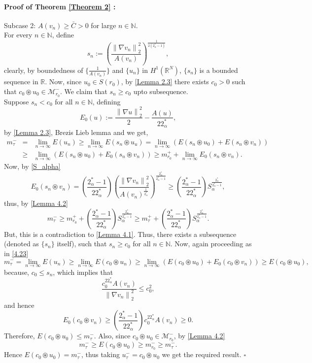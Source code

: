 \documentclass[11pt]{article}
\numberwithin{equation}{section}
\numberwithin{mytheorem}{section}
\newenvironment{myproof}[2] {\paragraph{Proof of {#1} {#2} :}}{\hfill$\square$}
\begin{document}
\begin{myproof}{Theorem}{\ref{Theorem 2}}
					Subcase 2: $A(v_n)\geq \bar{C}>0$ for large $n\in \mathbb{N}$.\\
					For every $n\in \mathbb{N}$, define $$s_n:=\left(\frac{\left\| \nabla v_n\right\|_2^2}{A(v_n)}\right)^{\frac{1}{2(2^*_{\alpha}-1)}},$$
					clearly, by boundedness of $\{\frac{1}{A(v_n)}\}$ and $\{u_n\}$ in $H^1(\mathbb{R}^N)$, $\{s_n\}$ is a bounded sequence in $\mathbb{R}$. Now, since $u_0\in S(r_0)$, by \autoref{Lemma 2.3} there exists $c_0>0$ such that $c_0\circledast u_0\in \mathcal{M}_{r_0}^-$. We claim that $s_n\geq c_0$ upto subsequence.\\
					Suppose $s_n<c_0$ for all $n\in \mathbb{N}$, defining 
					$$E_0(u):=\frac{\left\| \nabla u \right\|_2^2}{2}-\frac{A(u)}{22^*_{\alpha}},$$
					by \autoref{Lemma 2.3}, Brezis Lieb lemma and \cite[lemma~2.4]{Moroz2013groundstates} we get,
					\begin{eqnarray}\label{4.23}
						m_{\tau}^- & = & \lim_{n\rightarrow \infty}E(u_n) \geq \lim_{n\rightarrow \infty}E(s_n\circledast u_u) =\lim_{n\rightarrow \infty}\left(E(s_n\circledast u_0)+E(s_n \circledast v_n)\right)\nonumber\\
						& \geq & \lim_{n\rightarrow \infty}\left(E(s_n\circledast u_0)+E_0(s_n \circledast v_n)\right)\geq m_{r_0}^++ \lim_{n\rightarrow \infty}E_0(s_n\circledast v_n).
					\end{eqnarray}
					Now, by \eqref{S_alpha}
					$$E_0(s_n\circledast v_n) = \left(\frac{2^*_{\alpha}-1}{22^*_{\alpha}}\right)\left(\frac{\left\| \nabla v_n \right\|_2^2 }{A(v_n)^{\frac{1}{2^*_{\alpha}}}}\right)^{\frac{2^*_{\alpha}}{2^*_{\alpha}-1}}\geq \left(\frac{2^*_{\alpha}-1}{22^*_{\alpha}}\right)S_{\alpha}^{\frac{2^*_{\alpha}}{2^*_{\alpha}-1}},$$
					thus, by \autoref{Lemma 4.2} 
					$$m_{\tau}^-\geq m_{r_0}^++\left(\frac{2^*_{\alpha}-1}{22^*_{\alpha}}\right)S_{\alpha}^{\frac{2^*_{\alpha}}{2^*_{\alpha}-1}}\geq m_{\tau}^++\left(\frac{2^*_{\alpha}-1}{22^*_{\alpha}}\right)S_{\alpha}^{\frac{2^*_{\alpha}}{2^*_{\alpha}-1}}.$$
					But, this is a contradiction to \autoref{Lemma 4.1}. Thus, there exists a subsequence (denoted as $\{s_n\}$ itself), such that $s_n\geq c_0$ for all $n\in \mathbb{N}$. Now, again proceeding as in \eqref{4.23}
					\begin{equation*}
						m_{\tau}^-  =  \lim_{n\rightarrow \infty}E(u_n) \geq \lim_{n\rightarrow \infty}E(c_0\circledast u_n)\geq \lim_{n\rightarrow \infty}\left(E(c_0\circledast u_0)+E_0(c_0\circledast v_n)\right) \geq E(c_0\circledast u_0),
					\end{equation*}
					because, $c_0\leq s_n$, which implies that $$\frac{c_0^{22^*_{\alpha}}A(v_n)}{\left\| \nabla v_n \right\|_2^2}\leq c_0^2,$$ and hence
					$$E_0(c_0\circledast v_n)\geq \left(\frac{2^*_{\alpha}-1}{22^*_{\alpha}}\right)c_0^{22^*_{\alpha}}A(v_n)\geq0.$$
					Therefore, $E(c_0\circledast u_0) \leq m_{\tau}^-$. Also, since $c_0\circledast u_0\in \mathcal{M}_{r_0}^-$, by \autoref{Lemma 4.2}
					$$m_{\tau}^-\geq E(c_0\circledast u_0)\geq m_{r_0}^-\geq m_{\tau}^-.$$
					Hence $E(c_0\circledast u_0) = m_{\tau}^-$, thus taking $u_{\tau}^-=c_0\circledast u_0$ we get the required result.
				\end{myproof}
\end{document}
